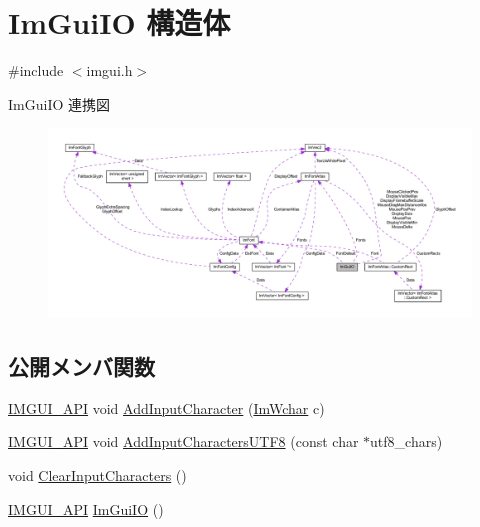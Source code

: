 \hypertarget{struct_im_gui_i_o}{}\section{Im\+Gui\+IO 構造体}
\label{struct_im_gui_i_o}


{\ttfamily \#include $<$imgui.\+h$>$}



Im\+Gui\+IO 連携図\nopagebreak
\begin{figure}[H]
\begin{center}
\leavevmode
\includegraphics[width=350pt]{struct_im_gui_i_o__coll__graph}
\end{center}
\end{figure}
\subsection*{公開メンバ関数}
\begin{DoxyCompactItemize}
\item 
\mbox{\hyperlink{imgui_8h_a43829975e84e45d1149597467a14bbf5}{I\+M\+G\+U\+I\+\_\+\+A\+PI}} void \mbox{\hyperlink{struct_im_gui_i_o_a52b6bdef9278de5ae2031311a269cf14}{Add\+Input\+Character}} (\mbox{\hyperlink{imgui_8h_af2c7badaf05a0008e15ef76d40875e97}{Im\+Wchar}} c)
\item 
\mbox{\hyperlink{imgui_8h_a43829975e84e45d1149597467a14bbf5}{I\+M\+G\+U\+I\+\_\+\+A\+PI}} void \mbox{\hyperlink{struct_im_gui_i_o_adaf150a1908c02c3cae15a35915bbb26}{Add\+Input\+Characters\+U\+T\+F8}} (const char $\ast$utf8\+\_\+chars)
\item 
void \mbox{\hyperlink{struct_im_gui_i_o_a82d8794e14e628efbb026af4202c70ca}{Clear\+Input\+Characters}} ()
\item 
\mbox{\hyperlink{imgui_8h_a43829975e84e45d1149597467a14bbf5}{I\+M\+G\+U\+I\+\_\+\+A\+PI}} \mbox{\hyperlink{struct_im_gui_i_o_a0ad8d993e50108b81b0d279d2d43f69d}{Im\+Gui\+IO}} ()
\end{DoxyCompactItemize}
